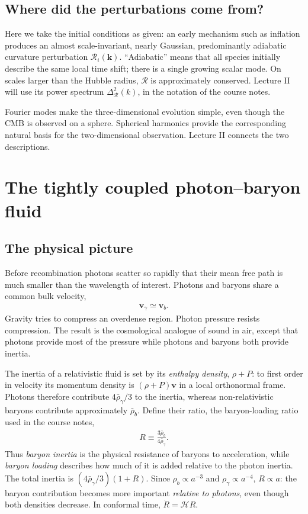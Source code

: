 \documentclass[12pt]{article}
\newcommand{\be}{\begin{eqnarray}}
\newcommand{\ee}{\end{eqnarray}}
\newcommand{\Hs}{\mathcal H}
\newcommand{\Rs}{\mathcal R}
\newcommand{\bk}{\mathbf k}
\newcommand{\bv}{\mathbf v}
\begin{document}
\subsection{Where did the perturbations come from?}
Here we take the initial conditions as given: an early mechanism such as
inflation produces an almost scale-invariant, nearly Gaussian, predominantly adiabatic
curvature perturbation $\Rs_i(\bk)$. ``Adiabatic'' means that all species initially
describe the same local time shift; there is a single growing scalar mode. On scales
larger than the Hubble radius, $\Rs$ is approximately conserved. Lecture II will use
its power spectrum $\Delta_{\Rs}^2(k)$, in the notation of the course notes.

Fourier modes make the three-dimensional evolution simple, even though the CMB is
observed on a sphere. Spherical harmonics provide the corresponding natural basis
for the two-dimensional observation. Lecture II connects the two descriptions.

\section{The tightly coupled photon--baryon fluid}
\label{sec:acoustics}

\subsection{The physical picture}
Before recombination photons scatter so rapidly that their mean free path is much
smaller than the wavelength of interest. Photons and baryons share a common bulk
velocity,
\be
\bv_\gamma\simeq\bv_b.
\ee
Gravity tries to compress an overdense region. Photon pressure resists compression.
The result is the cosmological analogue of sound in air, except that photons provide
most of the pressure while photons and baryons both provide inertia.

The inertia of a relativistic fluid is set by its \emph{enthalpy density}, $\rho+P$:
to first order in velocity its momentum density is $(\rho+P)\bv$ in a local
orthonormal frame. Photons therefore contribute $4\bar\rho_\gamma/3$ to the inertia,
whereas non-relativistic baryons contribute approximately $\bar\rho_b$.
Define their ratio, the baryon-loading ratio used in the course notes,
\be
\boxed{R\equiv\frac{3\bar\rho_b}{4\bar\rho_\gamma}.}
\label{eq:R}
\ee
Thus \emph{baryon inertia} is the physical resistance of baryons to acceleration,
while \emph{baryon loading} describes how much of it is added relative to the photon
inertia. The total inertia is $(4\bar\rho_\gamma/3)(1+R)$.
Since $\rho_b\propto a^{-3}$ and $\rho_\gamma\propto a^{-4}$, $R\propto a$: the
baryon contribution becomes more important \emph{relative to photons}, even though
both densities decrease. In conformal time, $\dot R=\Hs R$.
\end{document}
